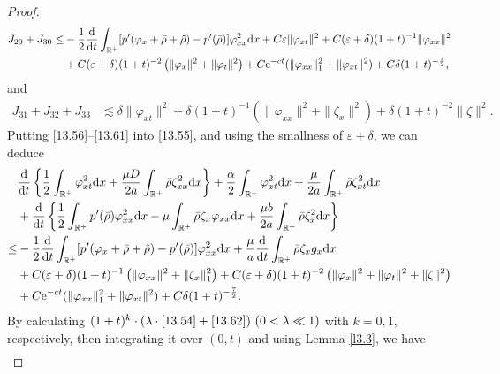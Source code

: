 \documentclass[11pt]{article}
\theoremstyle{plain}
\numberwithin{equation}{section}
\begin{document}
\begin{proof}
		\begin{align}\label{13.60}
			J_{29}+J_{30}
			\leq& -\frac{1}{2}\frac{{\rm d}}{{\rm d}t}\int_{\mathbb{R}^+}[p^{\prime}(\varphi_x+\bar\rho+\hat\rho)-p^{\prime}(\bar\rho)]\varphi_{xx}^2{\rm d}x+C\varepsilon\|\varphi_{xt}\|^2+C(\varepsilon+\delta)(1+t)^{-1}\|\varphi_{xx}\|^2\notag\\
			&+C(\varepsilon+\delta)(1+t)^{-2}\left(\|\varphi_{x}\|^2+\|\varphi_t\|^2\right)+C{\rm e}^{-ct}(\|\varphi_{xx}\|_1^2+\|\varphi_{xt}\|^2)+C\delta(1+t)^{-\frac{7}{2}},
		\end{align}
		and
		\begin{align}\label{13.61}
			J_{31}+J_{32}+J_{33}&
			\lesssim\delta\|\varphi_{xt}\|^2+\delta(1+t)^{-1}\left(\|\varphi_{xx}\|^2+\|\zeta_{x}\|^2\right)+\delta(1+t)^{-2}\|\zeta\|^2.
		\end{align}
		Putting \eqref{13.56}--\eqref{13.61} into \eqref{13.55}, and using the smallness of $\varepsilon+\delta$, we can deduce
		\begin{align}\label{13.62}
			&\frac{{\rm d}}{{\rm d}t}\left\{\frac{1}{2}\int_{\mathbb{R}^+}\varphi_{xt}^2{\rm d}x	+\frac{\mu D}{2a}\int_{\mathbb{R}^+}^{}\bar\rho\zeta_{xx}^2{\rm d}x\right\}+\frac{\alpha}{2}\int_{\mathbb{R}^+}\varphi_{xt}^2{\rm d}x+\frac{\mu}{2a}\int_{\mathbb{R}^+}^{}\bar\rho\zeta_{xt}^2{\rm d}x\notag\\
			&+\frac{{\rm d}}{{\rm d}t}\left\{\frac{1}{2}\int_{\mathbb{R}^+}p^{\prime}(\bar\rho)\varphi_{xx}^2{\rm d}x-\mu\int_{\mathbb{R}^+}\bar\rho\zeta_x \varphi_{xx}{\rm d}x+\frac{\mu b}{2a}\int_{\mathbb{R}^+}^{}\bar\rho\zeta_x^2{\rm d}x\right\}\notag\\
			\leq&
			-\frac{1}{2}\frac{{\rm d}}{{\rm d}t}\int_{\mathbb{R}^+}[p^{\prime}(\varphi_x+\bar\rho+\hat\rho)-p^{\prime}(\bar\rho)]\varphi_{xx}^2{\rm d}x+\frac{\mu}{a}\frac{{\rm d}}{{\rm d}t}\int_{\mathbb{R}^+}\bar\rho\zeta_x g_x{\rm d}x\notag\\
			&+ C(\varepsilon+\delta)(1+t)^{-1}\left(\|\varphi_{xx}\|^2+\|\zeta_x\|_1^2\right)+C(\varepsilon+\delta)(1+t)^{-2}\left(\|\varphi_{x}\|^2+\|\varphi_t\|^2+\|\zeta\|^2\right)\notag\\ 
			&+C{\rm e}^{-ct}(\|\varphi_{xx}\|_1^2+\|\varphi_{xt}\|^2)+C\delta(1+t)^{-\frac{7}{2}}.
		\end{align}	
By calculating $(1 + t)^k \cdot (\lambda \cdot\eqref{13.54} + \eqref{13.62}) ~(0 < \lambda\ll 1)$ with $k = 0, 1$, respectively, then integrating it over $(0, t)$ and using Lemma \ref{l3.3}, we have	
		\begin{align}\label{13.63}

\end{align}
\end{proof}
\end{document}
